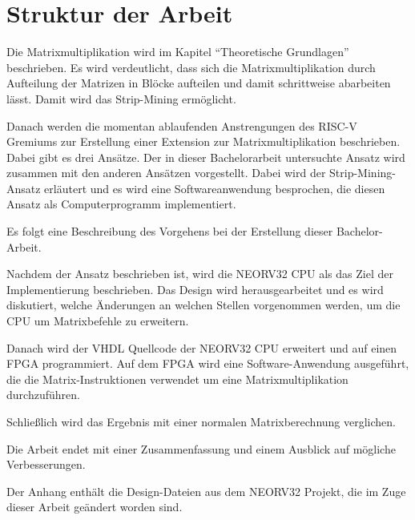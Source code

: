 \section{Struktur der Arbeit} \label{sec:Einleitung_Struktur_der_Arbeit}

Die Matrixmultiplikation wird im Kapitel ``Theoretische Grundlagen'' beschrieben. Es wird verdeutlicht, dass sich die Matrixmultiplikation durch Aufteilung der Matrizen in Blöcke aufteilen und damit schrittweise abarbeiten lässt. Damit wird das Strip-Mining ermöglicht.


Danach werden die momentan ablaufenden Anstrengungen des RISC-V Gremiums zur Erstellung einer Extension zur Matrixmultiplikation beschrieben. Dabei gibt es drei Ansätze. Der in dieser Bachelorarbeit untersuchte Ansatz wird zusammen mit den anderen Ansätzen vorgestellt. Dabei wird der Strip-Mining-Ansatz erläutert und es wird eine Softwareanwendung besprochen, die diesen Ansatz als Computerprogramm implementiert.

Es folgt eine Beschreibung des Vorgehens bei der Erstellung dieser Bachelor-Arbeit.

Nachdem der Ansatz beschrieben ist, wird die NEORV32 CPU als das Ziel der Implementierung beschrieben. Das Design wird herausgearbeitet und es wird diskutiert, welche Änderungen an welchen Stellen vorgenommen werden, um die CPU um Matrixbefehle zu erweitern.

Danach wird der VHDL Quellcode der NEORV32 CPU erweitert und auf einen FPGA programmiert. Auf dem FPGA wird eine Software-Anwendung ausgeführt, die die Matrix-Instruktionen verwendet um eine Matrixmultiplikation durchzuführen.

Schließlich wird das Ergebnis mit einer normalen Matrixberechnung verglichen.

Die Arbeit endet mit einer Zusammenfassung und einem Ausblick auf mögliche Verbesserungen.

Der Anhang enthält die Design-Dateien aus dem NEORV32 Projekt, die im Zuge dieser Arbeit geändert worden sind.